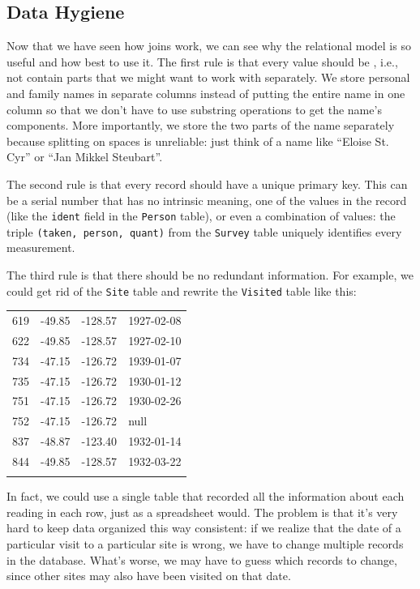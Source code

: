 \documentclass{book}
\begin{document}
\subsection{Data Hygiene}

Now that we have seen how joins work, we can see why the relational
model is so useful and how best to use it. The first rule is that every
value should be , i.e., not contain
parts that we might want to work with separately. We store personal and
family names in separate columns instead of putting the entire name in
one column so that we don't have to use substring operations to get the
name's components. More importantly, we store the two parts of the name
separately because splitting on spaces is unreliable: just think of a
name like ``Eloise St. Cyr'' or ``Jan Mikkel Steubart''.

The second rule is that every record should have a unique primary key.
This can be a serial number that has no intrinsic meaning, one of the
values in the record (like the \texttt{ident} field in the
\texttt{Person} table), or even a combination of values: the triple
\texttt{(taken, person, quant)} from the \texttt{Survey} table uniquely
identifies every measurement.

The third rule is that there should be no redundant information. For
example, we could get rid of the \texttt{Site} table and rewrite the
\texttt{Visited} table like this:

\begin{tabular}{@{}llll@{}}
\hline\noalign{\medskip}
619 & -49.85 & -128.57 & 1927-02-08
\\\noalign{\medskip}
622 & -49.85 & -128.57 & 1927-02-10
\\\noalign{\medskip}
734 & -47.15 & -126.72 & 1939-01-07
\\\noalign{\medskip}
735 & -47.15 & -126.72 & 1930-01-12
\\\noalign{\medskip}
751 & -47.15 & -126.72 & 1930-02-26
\\\noalign{\medskip}
752 & -47.15 & -126.72 & null
\\\noalign{\medskip}
837 & -48.87 & -123.40 & 1932-01-14
\\\noalign{\medskip}
844 & -49.85 & -128.57 & 1932-03-22
\\\noalign{\medskip}
\hline
\end{tabular}

In fact, we could use a single table that recorded all the information
about each reading in each row, just as a spreadsheet would. The problem
is that it's very hard to keep data organized this way consistent: if we
realize that the date of a particular visit to a particular site is
wrong, we have to change multiple records in the database. What's worse,
we may have to guess which records to change, since other sites may also
have been visited on that date.
\end{document}
